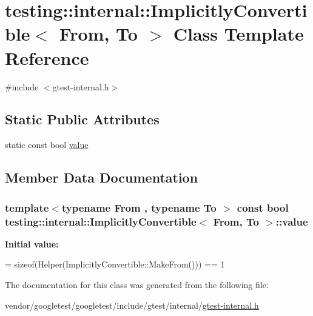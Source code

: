 \hypertarget{classtesting_1_1internal_1_1ImplicitlyConvertible}{}\section{testing\+:\+:internal\+:\+:Implicitly\+Convertible$<$ From, To $>$ Class Template Reference}
\label{classtesting_1_1internal_1_1ImplicitlyConvertible}


{\ttfamily \#include $<$gtest-\/internal.\+h$>$}

\subsection*{Static Public Attributes}
\begin{DoxyCompactItemize}
\item 
static const bool \hyperlink{classtesting_1_1internal_1_1ImplicitlyConvertible_aea51cecabca681fb75659e224771b7b7}{value}
\end{DoxyCompactItemize}


\subsection{Member Data Documentation}
\subsubsection[{\texorpdfstring{value}{value}}]{\setlength{\rightskip}{0pt plus 5cm}template$<$typename From , typename To $>$ const bool {\bf testing\+::internal\+::\+Implicitly\+Convertible}$<$ From, {\bf To} $>$\+::value\hspace{0.3cm}{\ttfamily [static]}}\hypertarget{classtesting_1_1internal_1_1ImplicitlyConvertible_aea51cecabca681fb75659e224771b7b7}{}\label{classtesting_1_1internal_1_1ImplicitlyConvertible_aea51cecabca681fb75659e224771b7b7}
{\bfseries Initial value\+:}
\begin{DoxyCode}
=
      \textcolor{keyword}{sizeof}(Helper(ImplicitlyConvertible::MakeFrom())) == 1
\end{DoxyCode}


The documentation for this class was generated from the following file\+:\begin{DoxyCompactItemize}
\item 
vendor/googletest/googletest/include/gtest/internal/\hyperlink{gtest-internal_8h}{gtest-\/internal.\+h}\end{DoxyCompactItemize}
